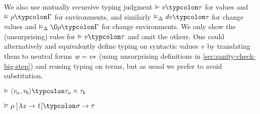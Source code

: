 We also use mutually recursive typing judgment \ensuremath{\vDash\Varid{v}\typcolon\tau} for values and \ensuremath{\vDash\rho\typcolon\Gamma} for environments, and similarly \ensuremath{\vDash_{\Delta}\Varid{dv}\typcolon\tau} for change values
and \ensuremath{\vDash_{\Delta}\D\rho\typcolon\Gamma} for change environments.
We only show the (unsurprising) rules for \ensuremath{\vDash\Varid{v}\typcolon\tau} and omit the others. One
could alternatively and equivalently define typing on syntactic values \ensuremath{\Varid{v}} by
translating them to neutral forms \ensuremath{\Varid{w}\mathrel{=}\Varid{v}\mathbin{*}} (using unsurprising definitions in
\cref{sec:sanity-check-big-step}) and reusing typing on terms, but as usual we
prefer to avoid substitution.
\begin{typing}

  {\ensuremath{\vDash\langle\Varid{v}_a,\Varid{v}_b\rangle\typcolon\tau_a\times\tau_b}}


{\ensuremath{\vDash\rho\;[\mskip1.5mu \lambda \Varid{x}\to \Varid{t}\mskip1.5mu]\typcolon\sigma\to \tau}}
\end{typing}

